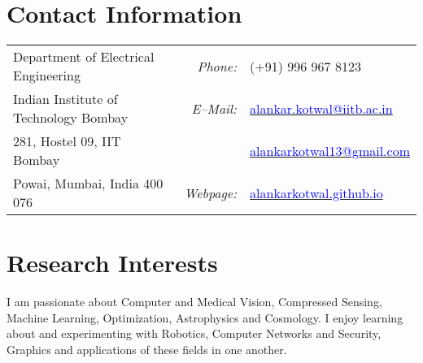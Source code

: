 \documentclass[margin,line]{res}
\begin{document}

\begin{resume}
\section{\sc Contact Information}
\vspace{.05in}
\begin{tabular}{@{}p{2.9in}p{.5in}p{3in}}
Department of Electrical Engineering & \multicolumn{1}{r}{\it Phone:}  &(+91) 996 967 8123 \\            
Indian Institute of Technology Bombay &\multicolumn{1}{r}{\it E--Mail:}& \href{mailto:alankar.kotwal@iitb.ac.in}{\textcolor{blue}{alankar.kotwal@iitb.ac.in}} \\ 
281, Hostel 09, IIT Bombay & & \href{mailto:alankarkotwal13@gmail.com}{\textcolor{blue}{alankarkotwal13@gmail.com}} \\ 
Powai, Mumbai, India 400 076 & \multicolumn{1}{r}{\it Webpage:} &\href{http://alankarkotwal.github.io/}{\textcolor{blue}{alankarkotwal.github.io}} \\     
\end{tabular}

\section{\sc Research Interests}
\lettrine[lines=2]{I}{} am passionate about Computer and Medical Vision, Compressed Sensing, Machine Learning, Optimization, Astrophysics and Cosmology. I enjoy learning about and experimenting with Robotics, Computer Networks and Security, Graphics and applications of these fields in one another.


\end{resume}
\end{document}
